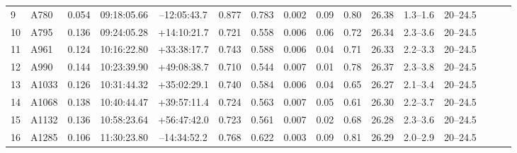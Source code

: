 \documentclass[useAMS,usenatbib]{mnras}
\begin{document}
\begin{table}
\begin{tabular*}{1.0\textwidth}{ l l c c c r c c c c c c c c l l }
9 & A780 & 0.054 & 09:18:05.66 & \hspace{1.5pt}--\hspace{0.5pt}12:05:43.7 & 0.877 & 0.783 & 0.002 \hspace{8pt}& 0.09 & 0.80 & 26.38 \hspace{8pt}& 1.3--1.6 \hspace{8pt}& 20--24.5 \\
10 & A795 & 0.136 & 09:24:05.28 & +14:10:21.7 & 0.721 & 0.558 & 0.006 \hspace{8pt}& 0.06 & 0.72 & 26.34 \hspace{8pt}& 2.3--3.6 \hspace{8pt}& 20--24.5 \\
11 & A961 & 0.124 & 10:16:22.80 & +33:38:17.7 & 0.743 & 0.588 & 0.006 \hspace{8pt}& 0.04 & 0.71 & 26.33 \hspace{8pt}& 2.2--3.3 \hspace{8pt}& 20--24.5 \\
12 & A990 & 0.144 & 10:23:39.90 & +49:08:38.7 & 0.710 & 0.544 & 0.007 \hspace{8pt}& 0.01 & 0.78 & 26.37 \hspace{8pt}& 2.3--3.8 \hspace{8pt}& 20--24.5 \\
13 & A1033 & 0.126 & 10:31:44.32 & +35:02:29.1 & 0.740 & 0.584 & 0.006 \hspace{8pt}& 0.04 & 0.65 & 26.27 \hspace{8pt}& 2.1--3.4 \hspace{8pt}& 20--24.5 \\
14 & A1068 & 0.138 & 10:40:44.47 & +39:57:11.4 & 0.724 & 0.563 & 0.007 \hspace{8pt}& 0.05 & 0.61 & 26.30 \hspace{8pt}& 2.2--3.7 \hspace{8pt}& 20--24.5 \\
15 & A1132 & 0.136 & 10:58:23.64 & +56:47:42.0 & 0.723 & 0.561 & 0.007 \hspace{8pt}& 0.02 & 0.68 & 26.28 \hspace{8pt}& 2.3--3.6 \hspace{8pt}& 20--24.5 \\
16 & A1285 & 0.106 & 11:30:23.80 & \hspace{1.5pt}--\hspace{0.5pt}14:34:52.2 & 0.768 & 0.622 & 0.003 \hspace{8pt}& 0.09 & 0.81 & 26.29 \hspace{8pt}& 2.0--2.9 \hspace{8pt}& 20--24.5 \\

\end{tabular*}
\end{table}
\end{document}
